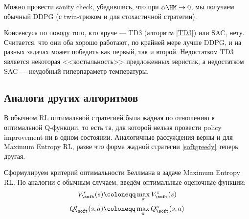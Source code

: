 Можно провести sanity check, убедившись, что при $\alpha \HM\to 0$, мы получаем обычный DDPG (с twin-трюком и для стохастичной стратегии).

\begin{remark}
Консенсуса по поводу того, кто круче --- TD3 (алгоритм \ref{TD3}) или SAC, нету. Считается, что они оба хорошо работают, по крайней мере лучше DDPG, и на разных задачах может победить как первый, так и второй. Недостатком TD3 является некоторая <<костыльность>> предложенных эвристик, а недостатком SAC --- неудобный гиперпараметр температуры.
\end{remark}

\subsection{Аналоги других алгоритмов}

В обычном RL оптимальной стратегией была жадная по отношению к оптимальной Q-функции, то есть та, для которой нельзя провести policy improvement ни в одном состоянии. Аналогичные рассуждения верны и для Maximum Entropy RL, разве что форма жадной стратегии \eqref{softgreedy} теперь другая.

Сформулируем критерий оптимальности Беллмана в задаче Maximum Entropy RL. По аналогии с обычным случаем, введём оптимальные оценочные функции:
$$V^*_{\soft}(s) \coloneqq \max_{\pi} V^{\pi}_{\soft}(s)$$
$$Q^*_{\soft}(s, a) \coloneqq \max_{\pi} Q^{\pi}_{\soft}(s, a)$$

